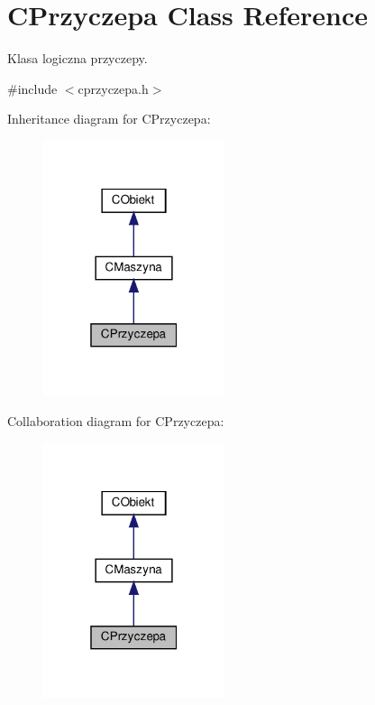 \hypertarget{class_c_przyczepa}{}\section{C\+Przyczepa Class Reference}
\label{class_c_przyczepa}


Klasa logiczna przyczepy.  




{\ttfamily \#include $<$cprzyczepa.\+h$>$}



Inheritance diagram for C\+Przyczepa\+:\nopagebreak
\begin{figure}[H]
\begin{center}
\leavevmode
\includegraphics[width=151pt]{class_c_przyczepa__inherit__graph}
\end{center}
\end{figure}


Collaboration diagram for C\+Przyczepa\+:\nopagebreak
\begin{figure}[H]
\begin{center}
\leavevmode
\includegraphics[width=151pt]{class_c_przyczepa__coll__graph}
\end{center}
\end{figure}
